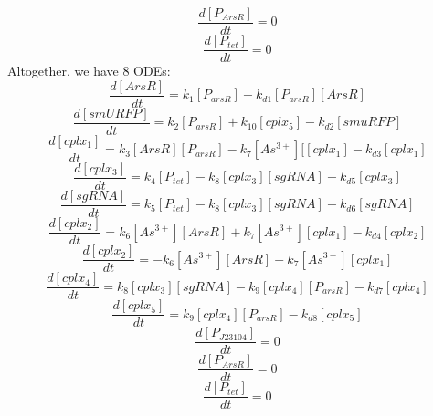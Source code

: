 \begin{equation}
\frac{d[P_{ArsR}]}{dt}=0\tag{11}
\end{equation} 
\begin{equation}
\frac{d[P_{tet}]}{dt}=0\tag{12}
\end{equation} 
Altogether, we have 8 ODEs:
\begin{equation}
\frac{d[ArsR]}{dt}=k_1[P_{arsR}]-k_{d1}[P_{arsR}][ArsR]\tag{1}
\end{equation}
\begin{equation}
\frac{d[smURFP]}{dt}=k_2[P_{arsR}]+k_{10}[cplx_5]-k_{d2}[smuRFP]\tag{2}
\end{equation}
\begin{equation}
\frac{d[cplx_1]}{dt}=k_3[ArsR][P_{arsR}]-k_7[As^{3+}][[cplx_1]-k_{d3}[cplx_1] \tag{3}
\end{equation}
\begin{equation}
\frac{d[cplx_3]}{dt}=k_4[P_{tet}]-k_{8}[cplx_3][sgRNA]-k_{d5}[cplx_3] \tag{4}
\end{equation}
\begin{equation}
\frac{d[sgRNA]}{dt}=k_5[P_{tet}]-k_{8}[cplx_3][sgRNA]-k_{d6}[sgRNA] \tag{5}
\end{equation}
\begin{equation}
\frac{d[cplx_2]}{dt}=k_{6}[As^{3+}][ArsR]+k_7[As^{3+}][cplx_1]-k_{d4}[cplx_2] \tag{6}
\end{equation}
\begin{equation}
\frac{d[cplx_2]}{dt}=-k_{6}[As^{3+}][ArsR]-k_7[As^{3+}][cplx_1] \tag{7}
\end{equation}
\begin{equation}
\frac{d[cplx_4]}{dt}=k_{8}[cplx_3][sgRNA]-k_{9}[cplx_4][P_{arsR}]-k_{d7}[cplx_4]\tag{8}
\end{equation}
\begin{equation}
\frac{d[cplx_5]}{dt}=k_{9}[cplx_4][P_{arsR}]-k_{d8}[cplx_5]\tag{9}
\end{equation} 
\begin{equation}
\frac{d[P_{J23104}]}{dt}=0\tag{10}
\end{equation} 
\begin{equation}
\frac{d[P_{ArsR}]}{dt}=0\tag{11}
\end{equation} 
\begin{equation}
\frac{d[P_{tet}]}{dt}=0\tag{12}
\end{equation} 
\\\\
